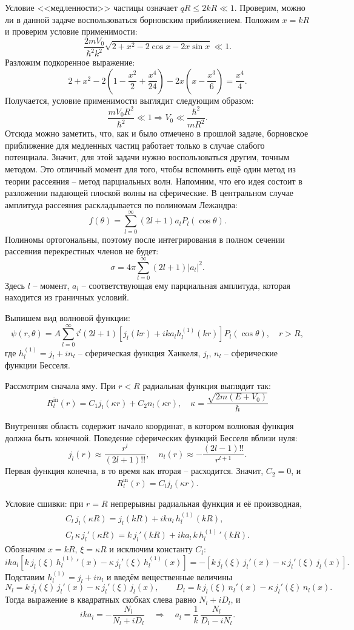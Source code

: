Условие <<медленности>> частицы означает $qR\leq2kR\ll1$. Проверим, можно ли в
данной задаче воспользоваться борновским приближением. Положим $x = kR$ и
проверим условие применимости:
\[
  \frac{2mV_0}{\hbar^2k^2}\sqrt{2+x^2-2\cos x - 2x\sin x}\ll 1.
\]
Разложим подкоренное выражение:
\[
  2+x^2-2\left(1-\frac{x^2}{2}+\frac{x^4}{24}\right) - 2x\left(x-\frac{x^3}{6}\right) = \frac{x^4}{4}.
\]
Получается, условие применимости выглядит следующим образом:
\[
  \frac{mV_0 R^2}{\hbar^2}\ll1 \Longrightarrow V_0\ll\frac{\hbar^2}{mR^2}.
\]
Отсюда можно заметить, что, как и было отмечено в прошлой задаче, борновское
приближение для медленных частиц работает только в случае слабого потенциала.
Значит, для этой задачи нужно воспользоваться другим, точным методом. Это
отличный момент для того, чтобы вспомнить ещё один метод из теории рассеяния --
метод парциальных волн. Напомним, что его идея состоит в разложении падающей
плоской волны на сферические. В центральном случае амплитуда рассеяния
раскладывается по полиномам Лежандра:
\[
  f(\theta) = \sum\limits_{l=0}^{\infty}(2l+1)a_l P_l(\cos\theta).
\]
Полиномы ортогональны, поэтому после интегрирования в полном сечении рассеяния
перекрестных членов не будет:
\[
  \sigma = 4\pi\sum\limits_{l=0}^{\infty} (2l+1)|a_l|^2.
\]
Здесь $l$ -- момент, $a_l$ -- соответствующая ему парциальная амплитуда,
которая находится из граничных условий.

Выпишем вид волновой функции:
\[
  \psi(r,\theta) = A\sum\limits_{l=0}^{\infty} i^l (2l+1)\left[j_l(kr)+ika_lh_l^{(1)}(kr)\right]P_l(\cos\theta), \quad r>R,
\]
где $h_l^{(1)} = j_l+in_l$ -- сферическая функция Ханкеля, $j_l$, $n_l$ --
сферические функции Бесселя.

Рассмотрим сначала яму. При $r<R$ радиальная функция выглядит так:
\[
  R_l^{\text{in}}(r) = C_1 j_{l}(\kappa r)+C_2 n_l(\kappa r), \quad \kappa = \frac{\sqrt{2m(E+V_0)}}{\hbar}
\]

Внутренняя область содержит начало координат, в котором волновая функция должна
быть конечной. Поведение сферических функций Бесселя вблизи нуля:
\[
  j_l(r)\approx\frac{r^l}{(2l+1)!!}, \quad n_l(r)\approx-\frac{(2l-1)!!}{r^{l+1}}.
\]
Первая функция конечна, в то время как вторая -- расходится. Значит, $C_2=0$, и
\[
  R_l^{\text{in}}(r) = C_l j_l(\kappa r).
\]

Условие сшивки: при $r=R$ непрерывны радиальная функция и её производная,
\begin{gather*}
  C_l\, j_l(\kappa R) = j_l(kR)+ika_l\,h_l^{(1)}(kR), \\ C_l\,\kappa\, j_l'(\kappa R) = k\,j_l'(kR)+ika_l\,k\,h_l^{(1)}\,'(kR).
\end{gather*}
Обозначим $x = kR$, $\xi = \kappa R$ и исключим константу $C_l$:
\[
  ika_l\left[k\,j_l(\xi)\,h_l^{(1)}\,'(x)-\kappa\, j_l'(\xi)\,h_l^{(1)}(x)\right] = -\left[k\,j_l(\xi)\,j_l'(x)-\kappa\, j_l'(\xi)\,j_l(x)\right].
\]
Подставим $h_l^{(1)} = j_l+in_l$ и введём вещественные величины
\[
  N_l = k\,j_l(\xi)\,j_l'(x)-\kappa\, j_l'(\xi)\,j_l(x), \qquad D_l = k\,j_l(\xi)\,n_l'(x)-\kappa\, j_l'(\xi)\,n_l(x).
\]
Тогда выражение в квадратных скобках слева равно $N_l+iD_l$, и
\[
  ika_l = -\frac{N_l}{N_l+iD_l} \quad\Longrightarrow\quad a_l = \frac{1}{k}\,\frac{N_l}{D_l-iN_l}.
\]

